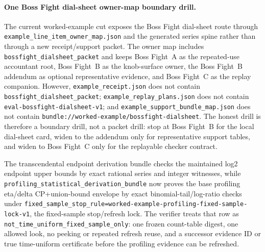 \documentclass[11pt]{article}
\begin{document}
\paragraph{One Boss Fight dial-sheet owner-map boundary drill.}
The current worked-example cut exposes the Boss Fight dial-sheet route through \nolinkurl{example\_line\_item\_owner\_map.json} and the generated series spine rather than through a new receipt/support packet. The owner map includes \texttt{bossfight\_dialsheet\_packet} and keeps Boss Fight~A as the repeated-use accountant root, Boss Fight~B as the knob-surface owner, the Boss Fight~B addendum as optional representative evidence, and Boss Fight~C as the replay companion. However, \texttt{example\_receipt.json} does not contain \texttt{bossfight\_dialsheet\_packet}; \texttt{example\_replay\_plans.json} does not contain \texttt{eval-bossfight-dialsheet-v1}; and \texttt{example\_support\_bundle\_map.json} does not contain \texttt{bundle://worked-example/bossfight-dialsheet}. The honest drill is therefore a boundary drill, not a packet drill: stop at Boss Fight~B for the local dial-sheet card, widen to the addendum only for representative support tables, and widen to Boss Fight~C only for the replayable checker contract.\cite{series:bossfightB,series:bossfightBaddendum,series:bossfightC,series:evalnotary,series:releaseproperty,series:workedexample,series:seriesspines}

The transcendental endpoint derivation bundle checks the maintained log2 endpoint upper bounds by exact rational series and integer witnesses, while \nolinkurl{profiling_statistical_derivation_bundle} now proves the base profiling eta/delta CP+union-bound envelope by exact binomial-tail/log-ratio checks under \nolinkurl{fixed_sample_stop_rule=worked-example-profiling-fixed-sample-lock-v1}, the fixed-sample stop/refresh lock.  The verifier treats that row as \nolinkurl{not_time_uniform_fixed_sample_only}: one frozen count-table digest, one allowed look, no peeking or repeated refresh reuse, and a successor evidence ID or true time-uniform certificate before the profiling evidence can be refreshed.
\end{document}
